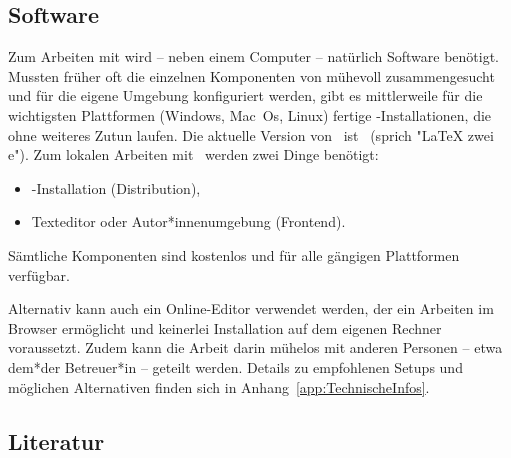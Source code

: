 \subsection{Software}
\label{sec:Software}

Zum Arbeiten mit \latex wird -- neben einem Computer -- natürlich Software
benötigt. Mussten früher oft die einzelnen Komponenten von \latex mühevoll
zusammengesucht und für die eigene Umgebung konfiguriert werden, gibt es
mittlerweile für die wichtigsten Plattformen (Windows, Mac~Os, Linux) fertige
\latex-Installationen, die ohne weiteres Zutun laufen. Die aktuelle Version von
\latex\ ist \LaTeXe\ (sprich "LaTeX zwei e"). Zum lokalen Arbeiten mit \latex\
werden zwei Dinge benötigt:
%
\begin{itemize}
    \item \latex-Installation (Distribution),
    \item Texteditor oder Autor*innenumgebung (Frontend).
\end{itemize}
%
Sämtliche Komponenten sind kostenlos und für alle gängigen Plattformen
verfügbar.

Alternativ kann auch ein Online-Editor verwendet werden, der ein Arbeiten im
Browser ermöglicht und keinerlei Installation auf dem eigenen Rechner
voraussetzt. Zudem kann die Arbeit darin mühelos mit anderen Personen -- etwa
dem*der Betreuer*in -- geteilt werden. Details zu empfohlenen Setups und
möglichen Alternativen finden sich in Anhang~\ref{app:TechnischeInfos}.

\subsection{Literatur}
\label{sec:literatur}

